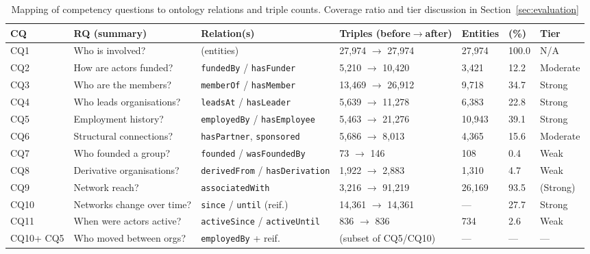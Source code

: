 \begin{table}[t]
\centering
\caption{Mapping of competency questions to ontology relations and triple counts. Coverage ratio and tier discussion in Section~\ref{sec:evaluation}}
\label{tab:coverage}
\begin{tabular}{p{} >{\raggedright}p{} >{\raggedright}p{} >{\raggedright}p{} >{\raggedright}p{} >{\raggedright}p{} p{}}
\hline
\textbf{CQ} & \textbf{RQ (summary)} & \textbf{Relation(s)} & \textbf{Triples (before$\to$after)} & \textbf{Entities} & \textbf{(\%)} & \textbf{Tier} \\
\hline
CQ1  & Who is involved?           & (entities)                                      & 27,974 $\to$ 27,974   & 27,974 & 100.0 & N/A \\
CQ2  & How are actors funded?     & \texttt{fundedBy} / \texttt{hasFunder}        & 5,210 $\to$ 10,420    & 3,421  & 12.2  & Moderate \\
CQ3  & Who are the members?       & \texttt{memberOf} / \texttt{hasMember}        & 13,469 $\to$ 26,912   & 9,718  & 34.7  & Strong \\
CQ4  & Who leads organisations?   & \texttt{leadsAt} / \texttt{hasLeader}         & 5,639 $\to$ 11,278    & 6,383  & 22.8  & Strong \\
CQ5  & Employment history?        & \texttt{employedBy} / \texttt{hasEmployee}    & 5,463 $\to$ 21,276    & 10,943 & 39.1  & Strong \\
CQ6  & Structural connections?    & \texttt{hasPartner}, \texttt{sponsored}       & 5,686 $\to$ 8,013     & 4,365  & 15.6  & Moderate \\
CQ7  & Who founded a group?       & \texttt{founded} / \texttt{wasFoundedBy}      & 73 $\to$ 146          & 108    & 0.4   & Weak \\
CQ8  & Derivative organisations?  & \texttt{derivedFrom} / \texttt{hasDerivation} & 1,922 $\to$ 2,883     & 1,310  & 4.7   & Weak \\
CQ9  & Network reach?             & \texttt{associatedWith}                       & 3,216 $\to$ 91,219    & 26,169 & 93.5  & (Strong) \\
CQ10 & Networks change over time? & \texttt{since} / \texttt{until} (reif.)       & 14,361 $\to$ 14,361   & ---    & 27.7  & Strong \\
CQ11 & When were actors active?   & \texttt{activeSince} / \texttt{activeUntil}   & 836 $\to$ 836         & 734    & 2.6   & Weak \\
CQ10+ CQ5 & Who moved between orgs? & \texttt{employedBy} + reif.                & (subset of CQ5/CQ10)  & ---    & ---   & --- \\
\hline
\end{tabular}%
\vspace{-0.5cm}
\end{table}
